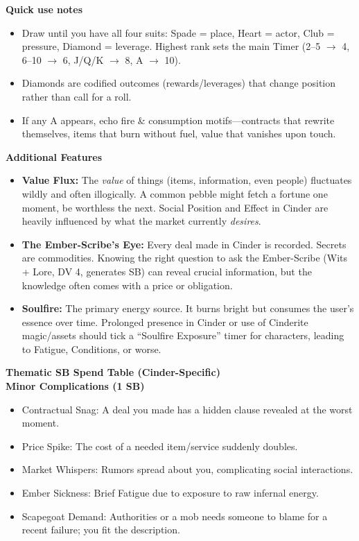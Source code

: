 \documentclass[11pt,letterpaper]{article}
\newcommand{\patronbox}[1]{\noindent\textbf{#1}\\}
\begin{document}
\patronbox{Quick use notes}
\begin{itemize}[leftmargin=*]
    \item Draw until you have all four suits: Spade = place, Heart = actor, Club = pressure, Diamond = leverage. Highest rank sets the main Timer (2--5 $\rightarrow$ 4, 6--10 $\rightarrow$ 6, J/Q/K $\rightarrow$ 8, A $\rightarrow$ 10).
    \item Diamonds are codified outcomes (rewards/leverages) that change position rather than call for a roll.
    \item If any A appears, echo fire \& consumption motifs---contracts that rewrite themselves, items that burn without fuel, value that vanishes upon touch.
\end{itemize}

\patronbox{Additional Features}
\begin{itemize}[leftmargin=*]
    \item \textbf{Value Flux:} The \textit{value} of things (items, information, even people) fluctuates wildly and often illogically. A common pebble might fetch a fortune one moment, be worthless the next. Social Position and Effect in Cinder are heavily influenced by what the market currently \textit{desires}.
    \item \textbf{The Ember-Scribe's Eye:} Every deal made in Cinder is recorded. Secrets are commodities. Knowing the right question to ask the Ember-Scribe (Wits + Lore, DV 4, generates SB) can reveal crucial information, but the knowledge often comes with a price or obligation.
    \item \textbf{Soulfire:} The primary energy source. It burns bright but consumes the user's essence over time. Prolonged presence in Cinder or use of Cinderite magic/assets should tick a ``Soulfire Exposure'' timer for characters, leading to Fatigue, Conditions, or worse.
\end{itemize}

\patronbox{Thematic SB Spend Table (Cinder-Specific)}
\textbf{Minor Complications (1 SB)}
\begin{itemize}[leftmargin=*]
    \item Contractual Snag: A deal you made has a hidden clause revealed at the worst moment.
    \item Price Spike: The cost of a needed item/service suddenly doubles.
    \item Market Whispers: Rumors spread about you, complicating social interactions.
    \item Ember Sickness: Brief Fatigue due to exposure to raw infernal energy.
    \item Scapegoat Demand: Authorities or a mob needs someone to blame for a recent failure; you fit the description.
\end{itemize}
\end{document}
